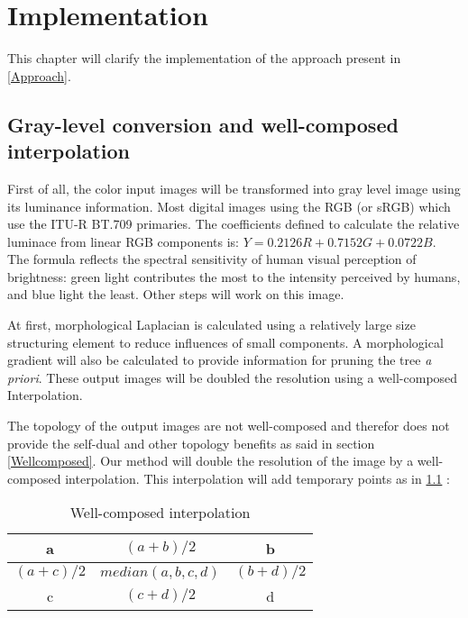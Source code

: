 
\graphicspath{ {5chapterImplementation/image/} }
\chapter{Implementation}

This chapter will clarify the implementation of the approach present in \ref{Approach}. 
\section{Gray-level conversion and well-composed interpolation}
First of all, the color input images will be transformed into gray level image using its luminance information. Most digital images using the RGB (or sRGB) which use the ITU-R BT.709 primaries. The coefficients defined to calculate the relative luminace from linear RGB components is: $Y = 0.2126R + 0.7152G + 0.0722B$. The formula reflects the spectral sensitivity of human visual perception of brightness: green light contributes the most to the intensity perceived by humans, and blue light the least. Other steps will work on this image. 
\par At first, morphological Laplacian is calculated using a relatively large size structuring element to reduce influences of small components. A morphological gradient will also be calculated to provide information for pruning the tree \textit{a priori}. These output images will be doubled the resolution using a well-composed Interpolation.

\par The topology of the output images are not well-composed and therefor does not provide the self-dual and other topology benefits as said in section \ref{Wellcomposed}. Our method will double the resolution of the image by a well-composed interpolation. This interpolation will add temporary points as in \ref{WllCmpInterpolation} :
\par
\begin{table}
	\centering
	\begin{tabular}{|c|c|c|}
	\hline 
	a & ${(a+b)}/{2}$ & b \\ 
	\hline 
	${(a+c)}/{2}$ & $median(a,b,c,d)$ & ${(b+d)}/{2}$ \\ 
	\hline 
	c & ${(c+d)}/{2}$ & d \\ 
	\hline 

	\end{tabular}
	\caption{Well-composed interpolation} \label{WllCmpInterpolation}
\end{table}


